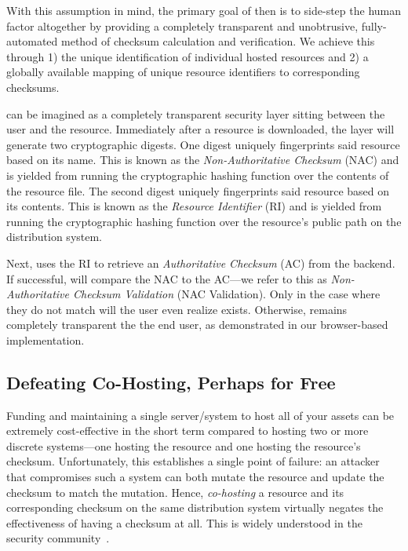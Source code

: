 With this assumption in mind, the primary goal of \SYSTEM{} then is to side-step
the human factor altogether by providing a completely transparent and
unobtrusive, fully-automated method of checksum calculation and verification. We
achieve this through 1) the unique identification of individual hosted resources
and 2) a globally available mapping of unique resource identifiers to
corresponding checksums.

\SYSTEM{} can be imagined as a completely transparent security layer sitting
between the user and the resource. Immediately after a resource is downloaded,
the \SYSTEM{} layer will generate two cryptographic digests. One digest uniquely
fingerprints said resource based on its name. This is known as the
\emph{Non-Authoritative Checksum} (NAC) and is yielded from running the
cryptographic hashing function over the contents of the resource file. The
second digest uniquely fingerprints said resource based on its contents. This is
known as the \emph{Resource Identifier} (RI) and is yielded from running the
cryptographic hashing function over the resource's public path on the
distribution system.

Next, \SYSTEM{} uses the RI to retrieve an \emph{Authoritative Checksum} (AC)
from the backend. If successful, \SYSTEM{} will compare the NAC to the AC---we
refer to this as \emph{Non-Authoritative Checksum Validation} (NAC Validation).
Only in the case where they do not match will the user even realize \SYSTEM{}
exists. Otherwise, \SYSTEM{} remains completely transparent the the end user, as
demonstrated in our browser-based implementation.


\subsection{Defeating Co-Hosting, Perhaps for Free}

Funding and maintaining a single server/system to host all of your assets can be
extremely cost-effective in the short term compared to hosting two or more
discrete systems---one hosting the resource and one hosting the resource's
checksum. Unfortunately, this establishes a single point of failure: an
attacker that compromises such a system can both mutate the resource and update
the checksum to match the mutation. Hence, \emph{co-hosting} a resource and its
corresponding checksum on the same distribution system virtually negates the
effectiveness of having a checksum at all. This is widely understood in the
security community~\cite{SCA-MINT2}.

